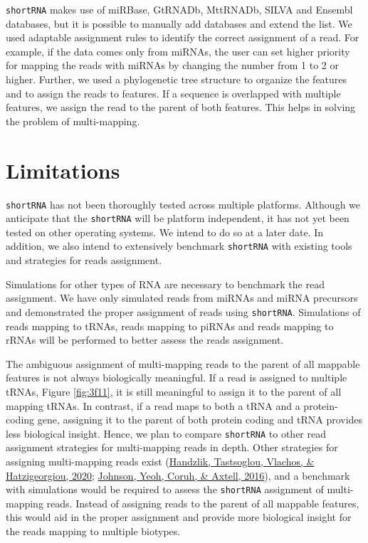 \documentclass[12pt,twoside]{reedthesis}
\begin{document}
\texttt{shortRNA} makes use of miRBase, GtRNADb, MttRNADb, SILVA and Ensembl
databases, but it is possible to manually add databases and extend the
list. We used adaptable assignment rules to identify the correct
assignment of a read. For example, if the data comes only from miRNAs,
the user can set higher priority for mapping the reads with miRNAs by
changing the number from 1 to 2 or higher. Further, we used a
phylogenetic tree structure to organize the features and to assign the
reads to features. If a sequence is overlapped with multiple features,
we assign the read to the parent of both features. This helps in solving
the problem of multi-mapping.

\hypertarget{limitations}{%
\section{Limitations}\label{limitations}}

\texttt{shortRNA} has not been thoroughly tested across multiple platforms.
Although we anticipate that the \texttt{shortRNA} will be platform independent,
it has not yet been tested on other operating systems. We intend to do
so at a later date. In addition, we also intend to extensively benchmark
\texttt{shortRNA} with existing tools and strategies for reads assignment.

Simulations for other types of RNA are necessary to benchmark the read
assignment. We have only simulated reads from miRNAs and miRNA
precursors and demonstrated the proper assignment of reads using
\texttt{shortRNA}. Simulations of reads mapping to tRNAs, reads mapping to piRNAs
and reads mapping to rRNAs will be performed to better assess the reads
assignment.

The ambiguous assignment of multi-mapping reads to the parent of all
mappable features is not always biologically meaningful. If a read is
assigned to multiple tRNAs, Figure \ref{fig:3f11}, it is still meaningful to assign
it to the parent of all mapping tRNAs. In contrast, if a read maps to
both a tRNA and a protein-coding gene, assigning it to the parent of
both protein coding and tRNA provides less biological insight. Hence, we
plan to compare \texttt{shortRNA} to other read assignment strategies for
multi-mapping reads in depth. Other strategies for assigning
multi-mapping reads exist (\protect\hyperlink{ref-handzlik2020}{Handzlik, Tastsoglou, Vlachos, \& Hatzigeorgiou, 2020}; \protect\hyperlink{ref-johnson2016}{Johnson, Yeoh, Coruh, \& Axtell, 2016}), and a benchmark
with simulations would be required to assess the \texttt{shortRNA} assignment of
multi-mapping reads. Instead of assigning reads to the parent of all
mappable features, this would aid in the proper assignment and provide
more biological insight for the reads mapping to multiple biotypes.
\end{document}
